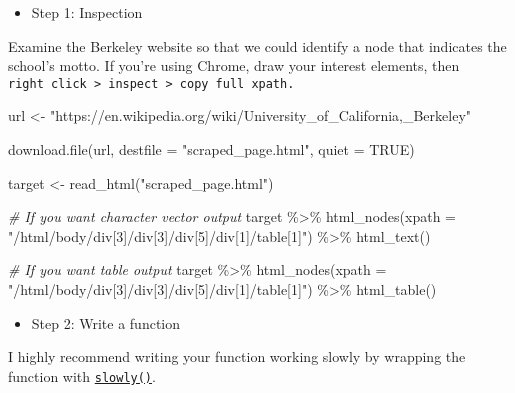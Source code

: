 \documentclass[
]{book}
\newenvironment{Shaded}{\begin{snugshade}}{\end{snugshade}}
\newcommand{\AttributeTok}[1]{\textcolor[rgb]{0.77,0.63,0.00}{#1}}
\newcommand{\CommentTok}[1]{\textcolor[rgb]{0.56,0.35,0.01}{\textit{#1}}}
\newcommand{\ConstantTok}[1]{\textcolor[rgb]{0.00,0.00,0.00}{#1}}
\newcommand{\FunctionTok}[1]{\textcolor[rgb]{0.00,0.00,0.00}{#1}}
\newcommand{\NormalTok}[1]{#1}
\newcommand{\OtherTok}[1]{\textcolor[rgb]{0.56,0.35,0.01}{#1}}
\newcommand{\SpecialCharTok}[1]{\textcolor[rgb]{0.00,0.00,0.00}{#1}}
\newcommand{\StringTok}[1]{\textcolor[rgb]{0.31,0.60,0.02}{#1}}
\providecommand{\tightlist}{%
  \setlength{\itemsep}{0pt}\setlength{\parskip}{0pt}}
\begin{document}
\begin{itemize}
\tightlist
\item
  Step 1: Inspection
\end{itemize}

Examine the Berkeley website so that we could identify a node that indicates the school's motto. If you're using Chrome, draw your interest elements, then \texttt{right\ click\ \textgreater{}\ inspect\ \textgreater{}\ copy\ full\ xpath.}

\begin{Shaded}
\begin{Highlighting}[]
\NormalTok{url }\OtherTok{\textless{}{-}} \StringTok{"https://en.wikipedia.org/wiki/University\_of\_California,\_Berkeley"}

\FunctionTok{download.file}\NormalTok{(url, }\AttributeTok{destfile =} \StringTok{"scraped\_page.html"}\NormalTok{, }\AttributeTok{quiet =} \ConstantTok{TRUE}\NormalTok{)}

\NormalTok{target }\OtherTok{\textless{}{-}} \FunctionTok{read\_html}\NormalTok{(}\StringTok{"scraped\_page.html"}\NormalTok{)}

\CommentTok{\# If you want character vector output}
\NormalTok{target }\SpecialCharTok{\%\textgreater{}\%}
  \FunctionTok{html\_nodes}\NormalTok{(}\AttributeTok{xpath =} \StringTok{"/html/body/div[3]/div[3]/div[5]/div[1]/table[1]"}\NormalTok{) }\SpecialCharTok{\%\textgreater{}\%}
  \FunctionTok{html\_text}\NormalTok{() }

\CommentTok{\# If you want table output }
\NormalTok{target }\SpecialCharTok{\%\textgreater{}\%}
  \FunctionTok{html\_nodes}\NormalTok{(}\AttributeTok{xpath =} \StringTok{"/html/body/div[3]/div[3]/div[5]/div[1]/table[1]"}\NormalTok{) }\SpecialCharTok{\%\textgreater{}\%}
  \FunctionTok{html\_table}\NormalTok{()}
\end{Highlighting}
\end{Shaded}

\begin{itemize}
\tightlist
\item
  Step 2: Write a function
\end{itemize}

I highly recommend writing your function working slowly by wrapping the function with \href{https://purrr.tidyverse.org/reference/insistently.html}{\texttt{slowly()}}.
\end{document}

